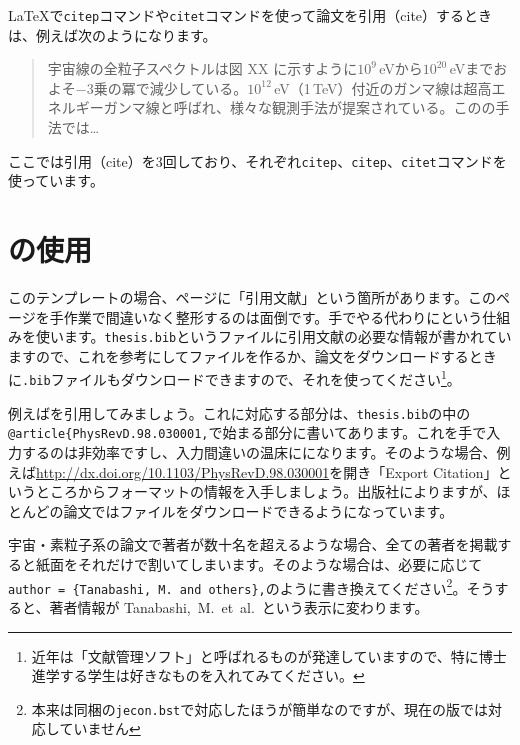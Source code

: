 \LaTeX{}で\texttt{citep}コマンドや\texttt{citet}コマンドを使って論文を引用（cite）するときは、例えば次のようになります。

\begin{quote} %
  宇宙線の全粒子スペクトルは図 XX に示すように$10^9$\,eVから$10^{20}$\,eVまでおよそ$-3$乗の冪で減少している\citep{Swordy2001}。$10^{12}$\,eV（1\,TeV）付近のガンマ線は超高エネルギーガンマ線と呼ばれ、様々な観測手法が提案されている\citep[例えば][を見よ]{Okumura2005}。この\citet{Okumura2005}の手法では\ldots
\end{quote}
ここでは引用（cite）を3回しており、それぞれ\texttt{citep}、\texttt{citep}、\texttt{citet}コマンドを使っています。

\section{\BibTeX{}の使用}
このテンプレートの場合、\pageref{page:bib}ページに「引用文献」という箇所があります。このページを手作業で間違いなく整形するのは面倒です。手でやる代わりに\BibTeX{}という仕組みを使います。\texttt{thesis.bib}というファイルに引用文献の必要な情報が書かれていますので、これを参考にして\BibTeX{}ファイルを作るか、論文をダウンロードするときに\texttt{.bib}ファイルもダウンロードできますので、それを使ってください\footnote{近年は「文献管理ソフト」と呼ばれるものが発達していますので、特に博士進学する学生は好きなものを入れてみてください。}。

例えば\cite{PhysRevD.98.030001}を引用してみましょう。これに対応する部分は、\texttt{thesis.bib}の中の\texttt{@article\{PhysRevD.98.030001,}で始まる部分に書いてあります。これを手で入力するのは非効率ですし、入力間違いの温床にになります。そのような場合、例えば\url{http://dx.doi.org/10.1103/PhysRevD.98.030001}を開き「Export Citation」というところから\BibTeX{}フォーマットの情報を入手しましょう。出版社によりますが、ほとんどの論文では\BibTeX{}ファイルをダウンロードできるようになっています。

宇宙・素粒子系の論文で著者が数十名を超えるような場合、全ての著者を掲載すると紙面をそれだけで割いてしまいます。そのような場合は、必要に応じて\texttt{author = \{Tanabashi, M. and others\},}のように書き換えてください\footnote{本来は同梱の\texttt{jecon.bst}で対応したほうが簡単なのですが、現在の版では対応していません}。そうすると、著者情報が Tanabashi,~M.~et~al.\ という表示に変わります。

